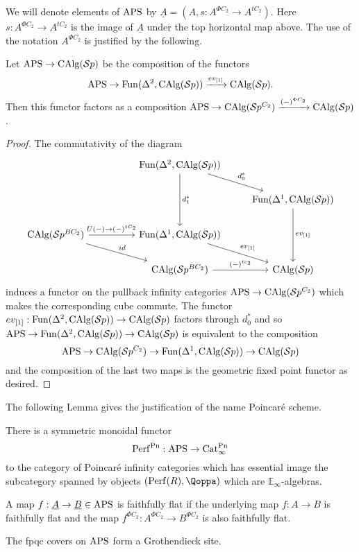 We will denote elements of $\mathrm{APS}$ by $\underline{A}=(A,s:A^{\Phi C_2}\to A^{tC_2})$. Here $s:A^{\Phi C_2}\to A^{tC_2}$ is the image of $\underline{A}$ under the top horizontal map above. The use of the notation $A^{\Phi C_2}$ is justified by the following.

\begin{lem}
Let $\mathrm{APS}\to \operatorname{CAlg}(\mathcal{S}p)$ be the composition of the functors \[\mathrm{APS}\to \operatorname{Fun}(\Delta^2,\operatorname{CAlg}(\mathcal{S}p))\xrightarrow{ev_{[1]}}\operatorname{CAlg}(\mathcal{S}p).\] Then this functor factors as a composition $\mathrm{APS}\to \operatorname{CAlg}(\mathcal{S}p^{C_2})\xrightarrow{(-)^{\Phi C_2}}\operatorname{CAlg}(\mathcal{S}p)$. 
\end{lem}
\begin{proof}
The commutativity of the diagram
\[
\begin{tikzcd}
 & & \operatorname{Fun}(\Delta^2, \calg(\Sp)) \arrow[rd, "d_0^*"] \arrow[dd, "d_1^*"] & \\
 & & & \operatorname{Fun}(\Delta^1,\calg(\Sp)) \arrow[dd,"ev_{[1]}"]\\
\calg(\Sp^{BC_2}) \arrow[rr, "U(-)\to (-)^{tC_2}"] \arrow[rrd, "id"] & & \operatorname{Fun}(\Delta^1, \calg(\Sp)) \arrow[rd, "ev_{[1]}"] & \\
  & & \calg(\Sp^{BC_2}) \arrow[r, "(-)^{tc_2}"] & \calg(\Sp)
\end{tikzcd}
\] induces a functor on the pullback infinity categories $\mathrm{APS}\to \operatorname{CAlg}(\mathcal{S}p^{C_2})$ which makes the corresponding cube commute. The functor $ev_{[1]}:\operatorname{Fun}(\Delta^2, \operatorname{CAlg}(\mathcal{S}p))\to \operatorname{CAlg}(\mathcal{S}p)$ factors through $d_0^*$ and so $\mathrm{APS}\to \operatorname{Fun}(\Delta^2, \operatorname{CAlg}(\mathcal{S}p))\to \operatorname{CAlg}(\mathcal{S}p)$ is equivalent to the composition \[\mathrm{APS}\to \operatorname{CAlg}(\mathcal{S}p^{C_2})\to \operatorname{Fun}(\Delta^1,\operatorname{CAlg}(\mathcal{S}p))\to \operatorname{CAlg}(\mathcal{S}p)\] and the composition of the last two maps is the geometric fixed point functor as desired.
\end{proof}

The following Lemma gives the justification of the name Poincar{\'e} scheme.

\begin{lem}
    There is a symmetric monoidal functor \[\mathrm{Perf}^{\mathrm{Pn}}:\mathrm{APS}\to \mathrm{Cat}_{\infty}^{\mathrm{Pn}}\] to the category of Poincar{\'e} infinity categories which has essential image the subcategory spanned by objects $(\perf(R),\Qoppa)$ which are $\mathbb{E}_\infty$-algebras.
\end{lem}

\begin{defn}
     A map $f:\underline{A}\to \underline{B}\in \mathrm{APS}$ is faithfully flat if the underlying map $f:A\to B$ is faithfully flat and the map $f^{\Phi C_2}:A^{\Phi C_2}\to B^{\Phi C_2}$ is also faithfully flat.
\end{defn}

\begin{lem}
    The fpqc covers on $\mathrm{APS}$ form a Grothendieck site. 
\end{lem}

